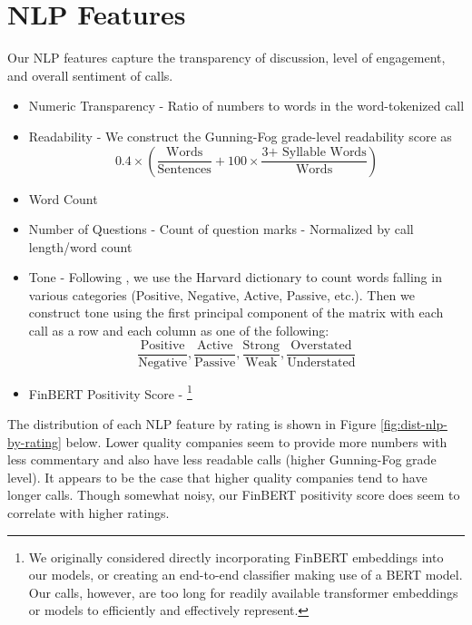 \documentclass{article}[11pt]
\begin{document}
    \section*{NLP Features}

    Our NLP features capture the transparency of discussion, level of engagement, and overall sentiment of calls.

    \begin{itemize}
        \item Numeric Transparency - Ratio of numbers to words in the word-tokenized call
        \item Readability - We construct the Gunning-Fog grade-level readability score \citep{gunning_technique_1952} as 
        \begin{equation*}
            0.4 \times (\frac{\text{Words}}{\text{Sentences}} + 100 \times \frac{\text{3+ Syllable Words}}{\text{Words}})
        \end{equation*}
        \item Word Count
        \item Number of Questions - Count of question marks - Normalized by call length/word count
        \item Tone - Following \cite{price_earnings_2012}, we use the Harvard dictionary to count words falling in various categories (Positive, Negative, Active, Passive, etc.). Then we construct tone using the first principal component of the matrix with each call as a row and each column as one of the following:
        \begin{equation*}
            \frac{\text{Positive}}{\text{Negative}}, \frac{\text{Active}}{\text{Passive}}, \frac{\text{Strong}}{\text{Weak}}, \frac{\text{Overstated}}{\text{Understated}}
        \end{equation*}
        \item FinBERT Positivity Score - \footnote{We originally considered directly incorporating FinBERT embeddings into our models, or creating an end-to-end classifier making use of a BERT model. Our calls, however, are too long for readily available transformer embeddings or models to efficiently and effectively represent.}
    \end{itemize}
    
    The distribution of each NLP feature by rating is shown in Figure \ref{fig:dist-nlp-by-rating} below. Lower quality companies seem to provide more numbers with less commentary and also have less readable calls (higher Gunning-Fog grade level). It appears to be the case that higher quality companies tend to have longer calls. Though somewhat noisy, our FinBERT positivity score does seem to correlate with higher ratings.
\end{document}
